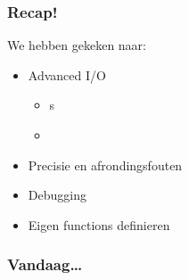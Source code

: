
\begin{frame}
\frametitle{Recap!}


We hebben gekeken naar:
\begin{itemize}
	\item<2-> Advanced I/O
		\begin{itemize}
		  \item<3-> s
		  \item<4-> 
		\end{itemize}
	\item<6-> Precisie en afrondingsfouten
	\item<7-> Debugging
	\item<8-> Eigen functions definieren
\end{itemize}
\end{frame}

\begin{frame}
\frametitle{Vandaag\ldots}




\end{frame}

% 
% 


